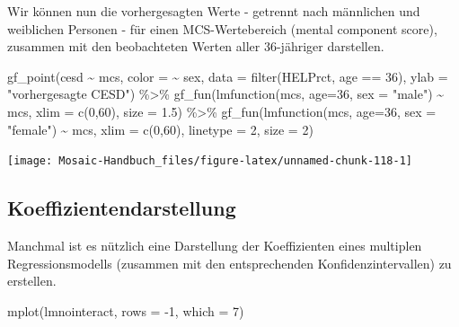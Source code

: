 \documentclass[
  ngerman,
]{scrbook}
\newenvironment{Shaded}{\begin{snugshade}}{\end{snugshade}}
\newcommand{\AttributeTok}[1]{\textcolor[rgb]{0.77,0.63,0.00}{#1}}
\newcommand{\DecValTok}[1]{\textcolor[rgb]{0.00,0.00,0.81}{#1}}
\newcommand{\FloatTok}[1]{\textcolor[rgb]{0.00,0.00,0.81}{#1}}
\newcommand{\FunctionTok}[1]{\textcolor[rgb]{0.00,0.00,0.00}{#1}}
\newcommand{\NormalTok}[1]{#1}
\newcommand{\SpecialCharTok}[1]{\textcolor[rgb]{0.00,0.00,0.00}{#1}}
\newcommand{\StringTok}[1]{\textcolor[rgb]{0.31,0.60,0.02}{#1}}
\begin{document}
Wir können nun die vorhergesagten Werte - getrennt nach männlichen und weiblichen Personen - für einen MCS-Wertebereich (mental component score), zusammen mit den beobachteten Werten aller 36-jähriger darstellen.

\begin{Shaded}
\begin{Highlighting}[]
\FunctionTok{gf\_point}\NormalTok{(cesd }\SpecialCharTok{\textasciitilde{}}\NormalTok{ mcs, }\AttributeTok{color =} \SpecialCharTok{\textasciitilde{}}\NormalTok{ sex,}
         \AttributeTok{data =} \FunctionTok{filter}\NormalTok{(HELPrct, age }\SpecialCharTok{==} \DecValTok{36}\NormalTok{),}
         \AttributeTok{ylab =} \StringTok{"vorhergesagte CESD"}\NormalTok{) }\SpecialCharTok{\%\textgreater{}\%}
\FunctionTok{gf\_fun}\NormalTok{(}\FunctionTok{lmfunction}\NormalTok{(mcs, }\AttributeTok{age=}\DecValTok{36}\NormalTok{, }\AttributeTok{sex =} \StringTok{"male"}\NormalTok{) }\SpecialCharTok{\textasciitilde{}}\NormalTok{ mcs,}
       \AttributeTok{xlim =} \FunctionTok{c}\NormalTok{(}\DecValTok{0}\NormalTok{,}\DecValTok{60}\NormalTok{), }\AttributeTok{size =} \FloatTok{1.5}\NormalTok{) }\SpecialCharTok{\%\textgreater{}\%}
\FunctionTok{gf\_fun}\NormalTok{(}\FunctionTok{lmfunction}\NormalTok{(mcs, }\AttributeTok{age=}\DecValTok{36}\NormalTok{, }\AttributeTok{sex =} \StringTok{"female"}\NormalTok{) }\SpecialCharTok{\textasciitilde{}}\NormalTok{ mcs,}
       \AttributeTok{xlim =} \FunctionTok{c}\NormalTok{(}\DecValTok{0}\NormalTok{,}\DecValTok{60}\NormalTok{), }\AttributeTok{linetype =} \DecValTok{2}\NormalTok{, }\AttributeTok{size =} \DecValTok{2}\NormalTok{)}
\end{Highlighting}
\end{Shaded}

\begin{center}\texttt{[image: Mosaic-Handbuch\_files/figure-latex/unnamed-chunk-118-1]} \end{center}

\hypertarget{koeffizientendarstellung}{%
\subsection{Koeffizientendarstellung}\label{koeffizientendarstellung}}

Manchmal ist es nützlich eine Darstellung der Koeffizienten eines multiplen Regressionsmodells (zusammen mit den entsprechenden Konfidenzintervallen) zu erstellen.

\begin{Shaded}
\begin{Highlighting}[]
\FunctionTok{mplot}\NormalTok{(lmnointeract, }\AttributeTok{rows =} \SpecialCharTok{{-}}\DecValTok{1}\NormalTok{, }\AttributeTok{which =} \DecValTok{7}\NormalTok{)}
\end{Highlighting}
\end{Shaded}
\end{document}

